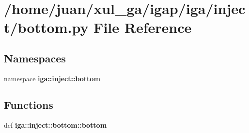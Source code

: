 \section{/home/juan/xul\_\-ga/igap/iga/inject/bottom.py File Reference}
\label{bottom_8py}
\subsection*{Namespaces}
\begin{CompactItemize}
\item 
namespace {\bf iga::inject::bottom}
\end{CompactItemize}
\subsection*{Functions}
\begin{CompactItemize}
\item 
def {\bf iga::inject::bottom::bottom}
\end{CompactItemize}
